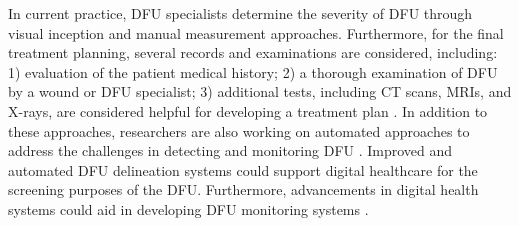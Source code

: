\documentclass[review]{elsarticle}
\begin{document}
\newline\indent In current practice, DFU specialists determine the severity of DFU through visual inception and manual measurement approaches. Furthermore, for the final treatment planning, several records and examinations are considered, including: 1) evaluation of the patient medical history; 2) a thorough examination of DFU by a wound or DFU specialist; 3) additional tests, including CT scans, MRIs, and X-rays, are considered helpful for developing a treatment plan \cite{edmonds2016diabetic}. In addition to these approaches, researchers are also working on automated approaches to address the challenges in detecting and monitoring DFU \cite{edmonds2006diabetic}. Improved and automated DFU delineation systems could support digital healthcare for the screening purposes of the DFU. Furthermore, advancements in digital health systems could aid in developing DFU monitoring systems \cite{2023internet}.
	
\end{document}
